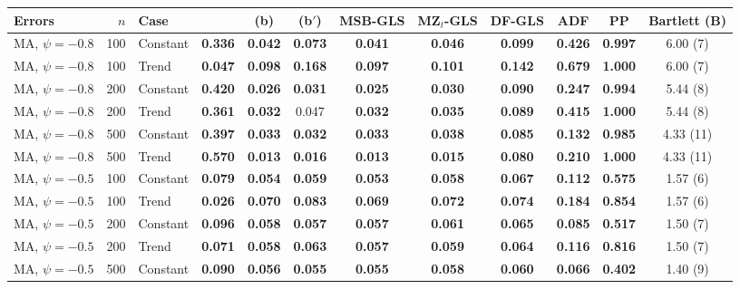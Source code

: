 \begin{tabular}{lrlccccccccc}
\toprule
Errors & $n$ & Case & \RMGLS{} & (b) & (b$'$) & MSB-GLS & MZ$_t$-GLS & DF-GLS & ADF & PP & Bartlett (B) \\
\midrule
MA, $\psi = -0.8$ & 100 & Constant & \textbf{0.336} & \textbf{0.042} & \textbf{0.073} & \textbf{0.041} & \textbf{0.046} & \textbf{0.099} & \textbf{0.426} & \textbf{0.997} & 6.00 (7) \\
MA, $\psi = -0.8$ & 100 & Trend & \textbf{0.047} & \textbf{0.098} & \textbf{0.168} & \textbf{0.097} & \textbf{0.101} & \textbf{0.142} & \textbf{0.679} & \textbf{1.000} & 6.00 (7) \\
MA, $\psi = -0.8$ & 200 & Constant & \textbf{0.420} & \textbf{0.026} & \textbf{0.031} & \textbf{0.025} & \textbf{0.030} & \textbf{0.090} & \textbf{0.247} & \textbf{0.994} & 5.44 (8) \\
MA, $\psi = -0.8$ & 200 & Trend & \textbf{0.361} & \textbf{0.032} & 0.047 & \textbf{0.032} & \textbf{0.035} & \textbf{0.089} & \textbf{0.415} & \textbf{1.000} & 5.44 (8) \\
MA, $\psi = -0.8$ & 500 & Constant & \textbf{0.397} & \textbf{0.033} & \textbf{0.032} & \textbf{0.033} & \textbf{0.038} & \textbf{0.085} & \textbf{0.132} & \textbf{0.985} & 4.33 (11) \\
MA, $\psi = -0.8$ & 500 & Trend & \textbf{0.570} & \textbf{0.013} & \textbf{0.016} & \textbf{0.013} & \textbf{0.015} & \textbf{0.080} & \textbf{0.210} & \textbf{1.000} & 4.33 (11) \\
\addlinespace
MA, $\psi = -0.5$ & 100 & Constant & \textbf{0.079} & \textbf{0.054} & \textbf{0.059} & \textbf{0.053} & \textbf{0.058} & \textbf{0.067} & \textbf{0.112} & \textbf{0.575} & 1.57 (6) \\
MA, $\psi = -0.5$ & 100 & Trend & \textbf{0.026} & \textbf{0.070} & \textbf{0.083} & \textbf{0.069} & \textbf{0.072} & \textbf{0.074} & \textbf{0.184} & \textbf{0.854} & 1.57 (6) \\
MA, $\psi = -0.5$ & 200 & Constant & \textbf{0.096} & \textbf{0.058} & \textbf{0.057} & \textbf{0.057} & \textbf{0.061} & \textbf{0.065} & \textbf{0.085} & \textbf{0.517} & 1.50 (7) \\
MA, $\psi = -0.5$ & 200 & Trend & \textbf{0.071} & \textbf{0.058} & \textbf{0.063} & \textbf{0.057} & \textbf{0.059} & \textbf{0.064} & \textbf{0.116} & \textbf{0.816} & 1.50 (7) \\
MA, $\psi = -0.5$ & 500 & Constant & \textbf{0.090} & \textbf{0.056} & \textbf{0.055} & \textbf{0.055} & \textbf{0.058} & \textbf{0.060} & \textbf{0.066} & \textbf{0.402} & 1.40 (9) \\

\end{tabular}
